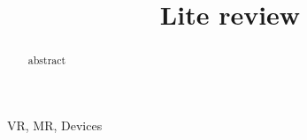 \documentclass[conference]{IEEEtran}
\begin{document}
	
	
	\title{Lite review}
	
	\author{}
	\author{
	}
	
	\maketitle
	
	\begin{abstract}
		
		abstract
		
	\end{abstract}
	
	\begin{IEEEkeywords}
		VR, MR, Devices
	\end{IEEEkeywords}
	
	
	
	
	
	
	
	
	
	
	
	
\end{document}
